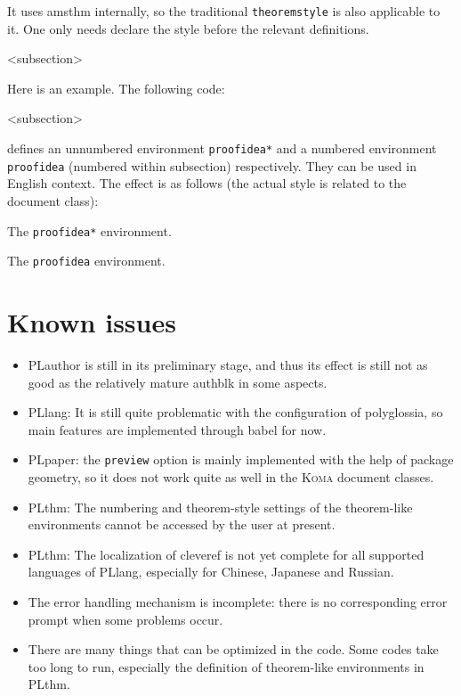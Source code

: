 \documentclass[allowbf]{lebhart}
\newenvironment{remind}[1][Remind]{%
    \begin{tcolorbox}[breakable,
        enhanced,
        width = \textwidth,
        colback = white, colbacktitle = paper,
        colframe = gray!50, boxrule=0.2mm,
        coltitle = black,
        fonttitle = \sffamily,
        attach boxed title to top left = {yshift=-\tcboxedtitleheight/2,  xshift=\tcboxedtitlewidth/4},
        boxed title style = {boxrule=0pt, colframe=paper},
        before skip = 0.3cm,
        after skip = 0.3cm,
        top = 3mm,
        bottom = 3mm,
        title={\scshape\sffamily #1}]%
}{\end{tcolorbox}}
\providecommand{\PLauthor}{\textsf{PLauthor}}
\providecommand{\PLlang}{\textsf{PLlang}}
\providecommand{\PLpaper}{\textsf{PLpaper}}
\providecommand{\PLthm}{\textsf{PLthm}}
\begin{document}
\begin{remind}
    It uses \textsf{amsthm} internally, so the traditional \texttt{theoremstyle} is also applicable to it. One only needs declare the style before the relevant definitions.
\end{remind}

\def\proofideanameEN{Idea}
<subsection>

\bigskip
Here is an example. The following code:
\begin{code}
  \def\proofideanameEN{Idea}
  <subsection>
\end{code}
defines an unnumbered environment \lstinline|proofidea*| and a numbered environment \lstinline|proofidea| (numbered within subsection) respectively. They can be used in English context. The effect is as follows (the actual style is related to the document class):

\begin{proofidea*}
    The \lstinline|proofidea*| environment.
\end{proofidea*}

\begin{proofidea}
    The \lstinline|proofidea| environment.
\end{proofidea}


\medskip
\section{Known issues}

\begin{itemize}[itemsep=.6em]
    \item \PLauthor{} is still in its preliminary stage, and thus its effect is still not as good as the relatively mature \textsf{authblk} in some aspects.
    \item \PLlang{}: It is still quite problematic with the configuration of \textsf{polyglossia}, so main features are implemented through \textsf{babel} for now.
    \item \PLpaper{}: the \texttt{preview} option is mainly implemented with the help of package \textsf{geometry}, so it does not work quite as well in the \textsc{\textsf{Koma}} document classes.
    \item \PLthm{}: The numbering and theorem-style settings of the theorem-like environments cannot be accessed by the user at present.
    \item \PLthm{}: The localization of \textsf{cleveref} is not yet complete for all supported languages of \PLlang{}, especially for Chinese, Japanese and Russian.
    \item The error handling mechanism is incomplete: there is no corresponding error prompt when some problems occur.
    \item There are many things that can be optimized in the code. Some codes take too long to run, especially the definition of theorem-like environments in \PLthm{}.
\end{itemize}
\end{document}
